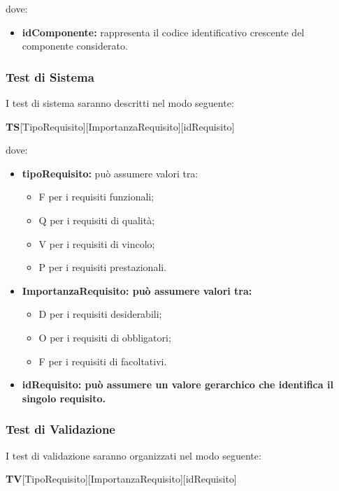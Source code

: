 	dove:
	\begin{itemize}
		\item \textbf{idComponente:} rappresenta il codice identificativo crescente del componente considerato.
	\end{itemize}
		
		
	\subsubsection{Test di Sistema}
	I test di sistema saranno descritti nel modo seguente: \Spazio
	\centerline{\textbf{TS}[TipoRequisito][ImportanzaRequisito][idRequisito]}
	
	dove:
	\begin{itemize}
		\item \textbf{tipoRequisito:} può assumere valori tra:
		\begin{itemize}
			\item F per i requisiti funzionali;
			\item Q per i requisiti di qualità;
			\item V per i requisiti di vincolo;
			\item P per i requisiti prestazionali.
		\end{itemize}
	
		\item \textbf{ImportanzaRequisito: può assumere valori tra:}
		\begin{itemize}
			\item D per i requisiti desiderabili;
			\item O per i requisiti di obbligatori;
			\item F per i requisiti di facoltativi.
		\end{itemize}
	
		\item \textbf{idRequisito: può assumere un valore gerarchico che identifica il singolo requisito.}
	\end{itemize}
	
		
	\subsubsection{Test di Validazione}
	I test di validazione saranno organizzati nel modo seguente:\Spazio
	
    \centerline{\textbf{TV}[TipoRequisito][ImportanzaRequisito][idRequisito]}

